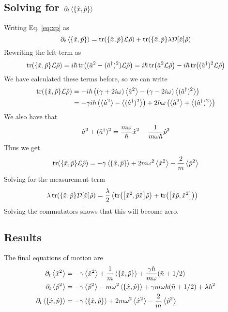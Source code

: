 \subsection{Solving for $\dt\expval{\acomm{\xop}{\pop}}$}
Writing Eq. \eqref{eq:xp} as
\begin{equation}
    \dt\expval{\acomm{\xop}{\pop}} = \tr(\acomm{\xop}{\pop} \liouvillian \dmatrix) + \tr(\acomm{\xop}{\pop} \lambda \super{\xop} \dmatrix)
\end{equation}
Rewriting the left term as 
\begin{equation}
    \tr(\acomm{\xop}{\pop}\liouvillian \dmatrix) = i\hbar \tr((\a^2 - (\ad)^2)\liouvillian \dmatrix) = i\hbar \tr(\a^2 \liouvillian \dmatrix) - i\hbar \tr((\ad)^2 \liouvillian \dmatrix)
\end{equation}
We have calculated these terms before, so we can write
\begin{align}
    \tr(\acomm{\xop}{\pop}\liouvillian \dmatrix) &= -i\hbar \left(  (\gamma + 2i\omega) \expval{\a^2} - (\gamma - 2 i \omega) \expval{(\ad)^2} \right)\\
    &= -\gamma  i\hbar \left( \expval{\a^2} - \expval{(\ad)^2} \right) + 2\hbar\omega \left(\expval{\a^2} + \expval{(\ad)^2} \right)
\end{align}
We also have that
\begin{equation}
    \hat{a}^2 +(\hat{a}^{\dagger})^2 = \frac{m\omega}{\hbar} \hat{x}^2 - \frac{1}{m\omega \hbar} \hat{p}^2
\end{equation}
Thus we get
\begin{equation}
    \tr(\acomm{\xop}{\pop}\liouvillian \dmatrix) =  -\gamma \expval{\acomm{\xop}{\pop}} + 2 m \omega^2 \expval{\xop^2} - \frac{2}{m} \expval{\pop^2}
\end{equation}
Solving for the measurement term
\begin{align}
    \lambda \tr(\acomm{\xop}{\pop}\super{\xop} \dmatrix) &= \frac{\lambda}{2} \left( \tr(\comm{\xop^2}{\pop\xop}\dmatrix) + \tr(\comm{\xop\pop}{\xop^2}) \right)
\end{align}
Solving the commutators shows that this will become zero.

\subsection{Results}
The final equations of motion are
\begin{align}
    \dt\expval{\xop^2} &= - \gamma \expval{\xop^2} + \frac{1}{m}\expval{\acomm{\xop}{\pop}} + \frac{\gamma \hbar}{m\omega}(\nbar + 1/2)\\
    \dt\expval{\pop^2} &= -\gamma \expval{\pop^2} - m\omega^2 \expval{\acomm{\xop}{\pop}} + \gamma m \omega\hbar (\nbar + 1/2) + \lambda \hbar^2\\
    \dt\expval{\acomm{\xop}{\pop}} &= -\gamma \expval{\acomm{\xop}{\pop}} + 2 m \omega^2 \expval{\xop^2} - \frac{2}{m} \expval{\pop^2}
\end{align}